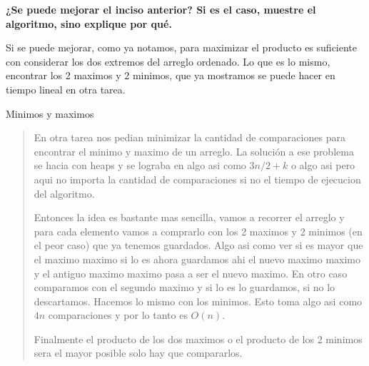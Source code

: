 \textbf{¿Se puede mejorar el inciso anterior? Si es el caso, muestre el algoritmo, sino explique por qué.}\vspace{.2cm}

Si se puede mejorar, como ya notamos, para maximizar el producto es suficiente con considerar los dos extremos del arreglo ordenado. Lo que es lo mismo, encontrar los 2 maximos y 2 minimos, que ya mostramos se puede hacer en tiempo lineal en otra tarea. \vspace{.2cm}

\textcolor{bibi}{Minimos y maximos}
\begin{quote}
    En otra tarea nos pedian minimizar la cantidad de comparaciones para encontrar el minimo y maximo de un arreglo. La solución a ese problema se hacia con heaps y se lograba en algo asi como $3n/2 + k$ o algo asi pero aqui no importa la cantidad de comparaciones si no el tiempo de ejecucion del algoritmo. \vspace{.2cm}

    Entonces la idea es bastante mas sencilla, vamos a recorrer el arreglo y para cada elemento vamos a comprarlo con los 2 maximos y 2 minimos (en el peor caso) que ya tenemos guardados. Algo asi como ver si es mayor que el maximo maximo si lo es ahora guardamos ahi el nuevo maximo maximo y el antiguo maximo maximo pasa a ser el nuevo maximo. En otro caso comparamos con el segundo maximo y si lo es lo guardamos, si no lo descartamos. Hacemos lo mismo con los minimos. Esto toma algo asi como $4n$ comparaciones y por lo tanto es $O(n)$. \vspace{.2cm}

    Finalmente el producto de los dos maximos o el producto de los 2 minimos sera el mayor posible solo hay que compararlos. \vspace{.2cm}
\end{quote}